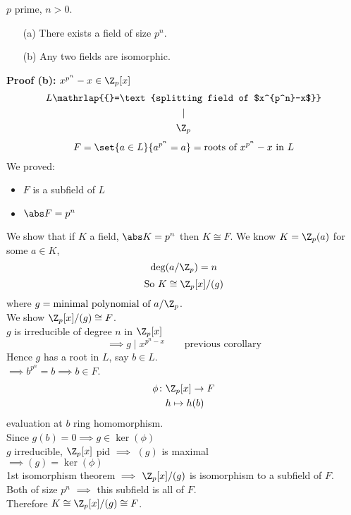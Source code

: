 \thm $p$ prime, $n>0$.
\begin{enumerate}
\item[(a)] There exists a field of size $p^n$.
\item[(b)] Any two fields are isomorphic.
\end{enumerate}
\textbf{Proof (b): }$x^{p^n}-x\in\Z_p[x]$
\begin{gather*}
L \mathrlap{{}=\text{splitting field of $x^{p^n}-x$}} \\
| \\
\Z_p
\end{gather*}
\[ F = \set{a\in L}{a^{p^n}=a} = \text{roots of $x^{p^n}-x$ in $L$} \]
We proved:
\begin{itemize}
\item $F$ is a subfield of $L$
\item $\abs F=p^n$
\end{itemize}
We show that if $K$ a field, $\abs K=p^n$ then $K\cong F$.
We know $K=\Z_p(a)$ for some $a\in K$,
\[ \deg(a/\Z_p) = n \]
\[ \text{So } K \cong \Z_p[x]/(g) \]
where $g=\text{minimal polynomial of $a/\Z_p$}$. \\
We show $\Z_p[x]/(g)\cong F$. \\
$g$ is irreducible of degree $n$ in $\Z_p[x]$
\[ \implies g \mid x^{p^n-x} \qquad \text{previous corollary} \]
Hence $g$ has a root in $L$, say $b\in L$. \\
$\implies b^{p^n}=b\implies b\in F$.
\begin{align*}
\phi\colon &\Z_p[x] \to F \\
&h\mapsto h(b)
\end{align*}
evaluation at $b$ ring homomorphism. \\
Since $g(b)=0\implies g\in\ker(\phi)$ \\
$g$ irreducible, $\Z_p[x]$ pid $\implies$ $(g)$ is maximal \\
$\implies (g)=\ker(\phi)$ \\
1st isomorphism theorem $\implies$ $\Z_p[x]/(g)$ is isomorphism to a subfield of $F$. \\
Both of size $p^n$ $\implies$ this subfield is all of $F$. \\
Therefore $K\cong\Z_p[x]/(g)\cong F$.

